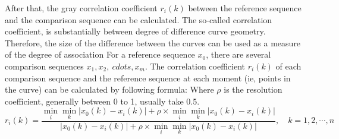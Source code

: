 \documentclass{mcmthesis}
\newcommand{\rmnum}[1]{\romannumeral #1}
\begin{document}
After that, the gray correlation coefficient $r_i(k)$ between the reference sequence and the comparison sequence can be calculated.
The so-called correlation coefficient, is substantially between degree of difference curve geometry. Therefore, the size of the difference between the curves can be used as a measure of the degree of association
For a reference sequence $ x_0 $, there are several comparison sequences $ x_1, x_2, \ cdots, x_m $. The correlation coefficient $ r_i (k) $ of each comparison sequence and the reference sequence at each moment (ie, points in the curve) can be calculated by following formula: Where $\rho$ is the resolution coefficient, generally between 0 to 1, usually take 0.5.
\begin{equation}
  r_i(k) = \frac{\min\limits_{i} \min\limits_{k}| x_0(k) - x_i(k)| + \rho \times \min\limits_{i} \min\limits_{k}| x_0(k) - x_i(k)|}{|x_0(k) - x_i(k)| + \rho \times \min\limits_{i} \min\limits_{k}| x_0(k) - x_i(k)|},\quad k=1,2,\cdots,n
\end{equation}

\newpage
\setcounter{page}{2}
\pagestyle{fancy} 
\rhead{\small\sffamily  \rmnum{\thepage}}



\end{document}
